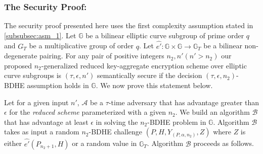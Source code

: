\subsubsection{The Security Proof:}

The security proof presented here uses the first complexity assumption stated in \ref{subsubsec:asm_1}. Let $\mathbb{G}$ be a bilinear elliptic curve subgroup of prime order $q$ and $G_T$ be a multiplicative group of order $q$. Let $\hat{e'}:\mathbb{G} \times \mathbb{G}\longrightarrow\mathbb{G}_T$ be a bilinear non-degenerate pairing. For any pair of positive integers $n_2,n' (n'>n_2)$ our proposed $n_2$-generalized reduced key-aggregate encryption scheme over elliptic curve subgroups is $(\tau,\epsilon,n')$ semantically secure if the decision $(\tau,\epsilon,n_2)$-BDHE assumption holds in $\mathbb{G}$. We now prove this statement below.

\textbf{} Let for a given input $n'$, $\mathcal{A}$ be a $\tau$-time adversary that has advantage greater than $\epsilon$ for the \emph{reduced scheme} parameterized with a given $n_2$. We build an algorithm $\mathcal{B}$ that has advantage at least $\epsilon$ in solving the $n_2$-BDHE problem in $\mathbb{G}$. Algorithm $\mathcal{B}$ takes as input a random $n_2$-BDHE challenge $(P,H,Y_{(P,\alpha,n_2)},Z)$ where $Z$ is either $\hat{e'}(P_{n_2+1},H)$ or a random value in $\mathbb{G}_T$. Algorithm $\mathcal{B}$ proceeds as follows.

